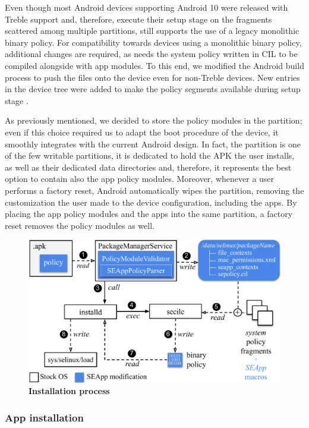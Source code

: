 Even though most Android devices supporting Android 10 were released
with Treble support and, therefore, execute their \sel setup stage on
the \sepolicy fragments scattered among multiple partitions, \init
still supports the use of a legacy monolithic binary policy.  For
compatibility towards devices using a monolithic binary policy,
additional changes are required, as \pap needs the system policy
written in CIL to be compiled alongside with app modules.  To this
end, we modified the Android build process to push the \sepolicy files
onto the device even for non-Treble devices.  New entries in the
device tree were added to make the policy segments available during
\init \sel setup stage \cite{seapp_early}.

As previously mentioned, we decided to store the policy modules in the
\data partition; even if this choice required us to adapt the boot
procedure of the device, it smoothly integrates \pap with the current
Android design.  In fact, the \data partition is one of the few
writable partitions, it is dedicated to hold the APK the user
installs, as well as their dedicated data directories and, therefore,
it represents the best option to contain also the app policy modules.
Moreover, whenever a user performs a factory reset, Android
automatically wipes the \data partition, removing the customization
the user made to the device configuration, including the apps.  By
placing the app policy modules and the apps into the same partition, a
factory reset removes the policy modules as well.

\begin{figure}[h]
	\begin{center}
		\includegraphics[width=0.8\columnwidth]{chapters/seapp/figs/app_installation}
	\end{center}
	\caption{\label{fig:seapp_install} \bf Installation process}
\end{figure}

\subsubsection{App installation}

